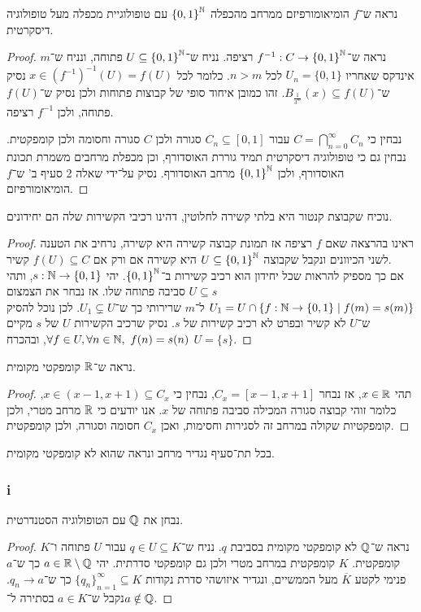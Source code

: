 \subquestion{}
נראה ש־$f$ הומיאומורפיזם ממרחב מהכפלה ${\{0, 1\}}^{\mathbb{N}}$ עם טופולוגיית מכפלה מעל טופולוגיה דיסקרטית.
\begin{proof}
	נראה ש־$f^{-1} : C \to {\{0, 1\}}^{\mathbb{N}}$ רציפה.
	נניח ש־$U \subseteq {\{0, 1\}}^{\mathbb{N}}$ פתוחה, ונניח ש־$m$ אינדקס שאחריו $U_n = \{0, 1\}$ לכל $n > m$.
	כלומר לכל $x \in {(f^{-1})}^{-1}(U) = f(U)$ נסיק ש־$B_{\frac{1}{3^m}}(x) \subseteq f(U)$.
	זהו כמובן איחוד סופי של קבוצות פתוחות ולכן נסיק ש־$f(U)$ פתוחה, ולכן $f^{-1}$ רציפה.

	נבחין כי $C = \bigcap_{n = 0}^\infty C_n$ עבור $C_n \subseteq [0, 1]$ סגורה ולכן $C$ סגורה וחסומה ולכן קומפקטית.
	נבחין גם כי טופולוגיה דיסקרטית תמיד גוררת האוסדורף, וכן מכפלת מרחבים משמרת תכונת האוסדורף, ולכן ${\{0, 1\}}^{\mathbb{N}}$ מרחב האוסדורף.
	נסיק על־ידי שאלה 2 סעיף ב' ש־$f$ הומיאומורפיזם.
\end{proof}

\subquestion{}
נוכיח שקבוצת קנטור היא בלתי קשירה לחלוטין, דהינו רכיבי הקשירות שלה הם יחידונים.
\begin{proof}
	ראינו בהרצאה שאם $f$ רציפה אז תמונת קבוצה קשירה היא קשירה, נרחיב את הטענה לשני הכיוונים ונקבל שקבוצה $U \subseteq {\{0, 1\}}^{\mathbb{N}}$ היא קשירה אם ורק אם $f(U) \subseteq C$ קשיר. \\
	אם כך מספיק להראות שכל יחידון הוא רכיב קשירות ב־${\{0, 1\}}^{\mathbb{N}}$.
	יהי $s : \mathbb{N} \to \{0, 1\}$, ותהי $U \subseteq s$ סביבה פתוחה שלו.
	אז נבחר את הצמצום $U_1 = U \cap \{ f : \mathbb{N} \to \{0, 1\} \mid f(m) = s(m) \}$ ל־$m$ שרירותי כך ש־$U_1 \subsetneq U$.
	לכן נוכל להסיק ש־$U$ לא קשיר ובפרט לא רכיב קשירות של $s$.
	נסיק שרכיב הקשירות $U$ של $s$ מקיים $\forall f \in U, \forall n \in \NN,\ f(n) = s(n)$, ובהכרח $U = \{ s \}$.
\end{proof}

\question{}
\subquestion{}
נראה ש־$\mathbb{R}$ קומפקטי מקומית.
\begin{proof}
	תהי $x \in \mathbb{R}$, אז נבחר $C_x = [x - 1, x + 1]$, נבחין כי $x \in (x - 1, x + 1) \subseteq C_x$, כלומר זוהי קבוצה סגורה המכילה סביבה פתוחה של $x$.
	אנו יודעים כי $\mathbb{R}$ מרחב מטרי, ולכן קומפקטיות שקולה במרחב זה לסגירות וחסימות, ואכן $C_x$ חסומה וסגורה, ולכן קומפקטית.
\end{proof}

\subquestion{}
בכל תת־סעיף נגדיר מרחב ונראה שהוא לא קומפקטי מקומית.

\subsubsection{i}
נבחן את $\mathbb{Q}$ עם הטופולוגיה הסטנדרטית.
\begin{proof}
	נראה ש־$\mathbb{Q}$ לא קומפקטי מקומית בסביבת $q$.
	נניח ש־$q \in U \subseteq K$ עבור $U$ פתוחה ו־$K$ קומפקטית.
	$K$ קומפקטית במרחב מטרי ולכן גם קומפקטי סדרתית.
	יהי $a \in \mathbb{R} \setminus \mathbb{Q}$ כך ש־$a$ פנימי לקטע $\overline{K}$ מעל הממשיים, ונגדיר איזושהי סדרת נקודות ${\{ q_n \}}_{n = 1}^\infty \subseteq K$ כך ש־$q_n \to a$.
	נקבל ש־$a \in K$ בסתירה ל־$a \notin \mathbb{Q}$.
\end{proof}

